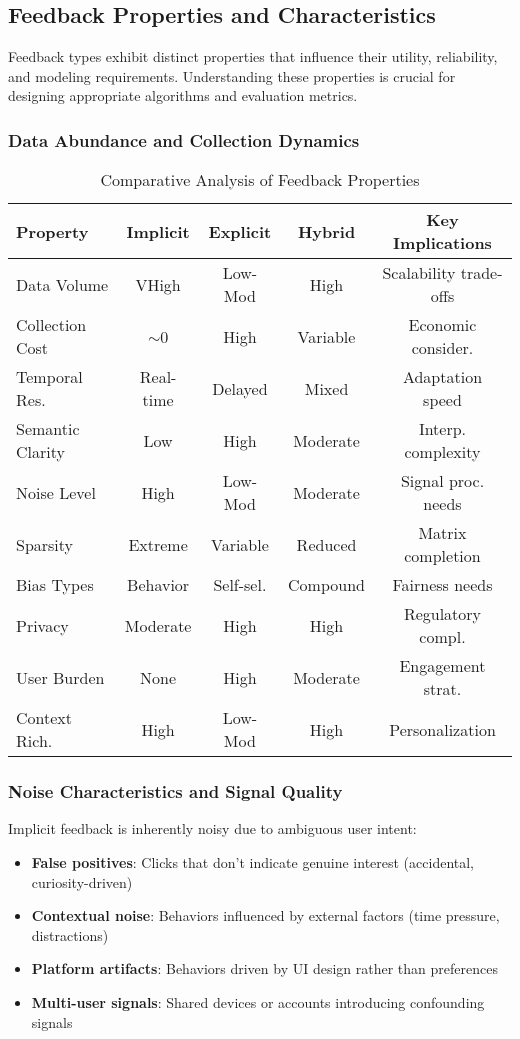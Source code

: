 \subsection{Feedback Properties and Characteristics}

Feedback types exhibit distinct properties that influence their utility, reliability, and modeling requirements. Understanding these properties is crucial for designing appropriate algorithms and evaluation metrics.

\subsubsection{Data Abundance and Collection Dynamics}

\begin{table}[h]
\centering
\tiny
\caption{Comparative Analysis of Feedback Properties}
\label{tab:feedback_properties_detailed}
\begin{tabular}{@{}lcccc@{}}
\toprule
Property & Implicit & Explicit & Hybrid & Key Implications \\
\midrule
Data Volume & VHigh & Low-Mod & High & Scalability trade-offs \\
Collection Cost & $\sim$0 & High & Variable & Economic consider. \\
Temporal Res. & Real-time & Delayed & Mixed & Adaptation speed \\
Semantic Clarity & Low & High & Moderate & Interp. complexity \\
Noise Level & High & Low-Mod & Moderate & Signal proc. needs \\
Sparsity & Extreme & Variable & Reduced & Matrix completion \\
Bias Types & Behavior & Self-sel. & Compound & Fairness needs \\
Privacy & Moderate & High & High & Regulatory compl. \\
User Burden & None & High & Moderate & Engagement strat. \\
Context Rich. & High & Low-Mod & High & Personalization \\
\bottomrule
\end{tabular}
\end{table}

\subsubsection{Noise Characteristics and Signal Quality}

Implicit feedback is inherently noisy due to ambiguous user intent:
\begin{itemize}
    \item \textbf{False positives}: Clicks that don't indicate genuine interest (accidental, curiosity-driven)
    \item \textbf{Contextual noise}: Behaviors influenced by external factors (time pressure, distractions)
    \item \textbf{Platform artifacts}: Behaviors driven by UI design rather than preferences
    \item \textbf{Multi-user signals}: Shared devices or accounts introducing confounding signals
\end{itemize}


